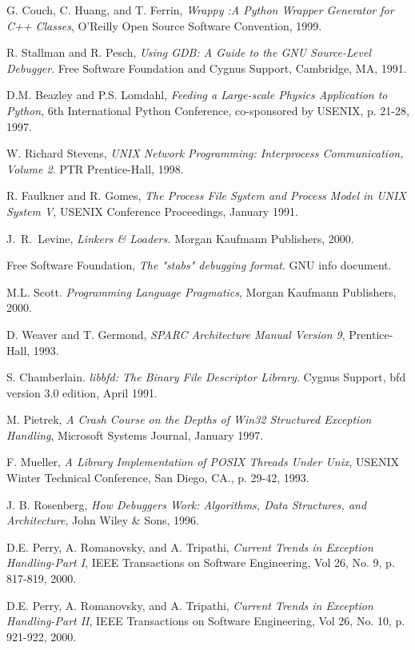 \begin{thebibliography}{99}
 G. Couch, C. Huang, and T. Ferrin, {\em Wrappy :A Python Wrapper
Generator for C++ Classes}, O'Reilly Open Source Software Convention, 1999.

 R. Stallman and R. Pesch, {\em Using GDB: A Guide to the GNU Source-Level Debugger}.
Free Software Foundation and Cygnus Support, Cambridge, MA, 1991.

 D.M. Beazley and P.S. Lomdahl, {\em Feeding a
Large-scale Physics Application to Python}, 6th International Python
Conference, co-sponsored by USENIX, p. 21-28, 1997.

 W. Richard Stevens, {\em UNIX Network Programming: Interprocess Communication, Volume 2}. PTR
Prentice-Hall, 1998. 

 R. Faulkner and R. Gomes, {\em The Process File System and Process Model in UNIX System V}, USENIX Conference Proceedings,
January 1991. 

 J.~R.~Levine, {\em Linkers \& Loaders.} Morgan Kaufmann Publishers, 2000.

 Free Software Foundation, {\em The "stabs" debugging format}. GNU info document.

 M.L. Scott. {\em Programming Language Pragmatics}, Morgan Kaufmann Publishers, 2000.

 D. Weaver and T. Germond, {\em SPARC Architecture Manual Version 9},
Prentice-Hall, 1993.

 S. Chamberlain. {\em libbfd: The Binary File Descriptor Library}. Cygnus Support, bfd version 3.0 edition, April 1991. 

 M. Pietrek, {\em A Crash Course on the Depths of Win32 Structured Exception Handling}, 
Microsoft Systems Journal, January 1997.

 F. Mueller, {\em A Library Implementation of POSIX Threads Under Unix},
USENIX Winter Technical Conference, San Diego, CA., p. 29-42, 1993.

 J. B. Rosenberg, {\em How Debuggers Work: Algorithms, Data Structures, and
Architecture}, John Wiley \& Sons, 1996.

 D.E. Perry, A. Romanovsky, and A. Tripathi, {\em
Current Trends in Exception Handling-Part I},
IEEE Transactions on Software Engineering, Vol 26, No. 9, p. 817-819, 2000.

 D.E. Perry, A. Romanovsky, and A. Tripathi, {\em
Current Trends in Exception Handling-Part II},
IEEE Transactions on Software Engineering, Vol 26, No. 10, p. 921-922, 2000.



\end{thebibliography}
